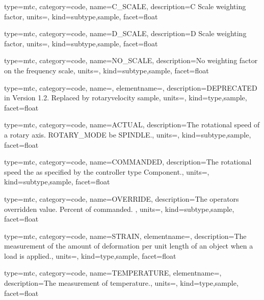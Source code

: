 {
  type=mtc,
  category=code,
  name={C\_SCALE},
  description={C Scale weighting factor},
  units=,
  kind={subtype,sample},
  facet={\gls{float}}
}


{
  type=mtc,
  category=code,
  name={D\_SCALE},
  description={D Scale weighting factor},
  units=,
  kind={subtype,sample},
  facet={\gls{float}}
}


{
  type=mtc,
  category=code,
  name={NO\_SCALE},
  description={No weighting factor on the frequency scale},
  units=,
  kind={subtype,sample},
  facet={\gls{float}}
}


{
  type=mtc,
  category=code,
  name={},
  elementname=,
  description={DEPRECATED in Version 1.2.  Replaced by \gls{rotaryvelocity sample}},
  units={},
  kind={type,sample},
  facet={\gls{float}}
}


{
  type=mtc,
  category=code,
  name={ACTUAL},
  description={The rotational speed of a rotary axis.  ROTARY\_MODE \must be SPINDLE.},
  units=,
  kind={subtype,sample},
  facet={\gls{float}}
}


{
  type=mtc,
  category=code,
  name={COMMANDED},
  description={The rotational speed the as specified by the \gls{controller} type Component.},
  units=,
  kind={subtype,sample},
  facet={\gls{float}}
}


{
  type=mtc,
  category=code,
  name={OVERRIDE},
  description={The operators overridden value.  Percent of commanded. },
  units=,
  kind={subtype,sample},
  facet={\gls{float}}
}


{
  type=mtc,
  category=code,
  name={STRAIN},
  elementname=,
  description={The measurement of the amount of deformation per unit length of an object when a load is applied.},
  units=,
  kind={type,sample},
  facet={\gls{float}}
}


{
  type=mtc,
  category=code,
  name={TEMPERATURE},
  elementname=,
  description={The measurement of temperature.},
  units=,
  kind={type,sample},
  facet={\gls{float}}
}


